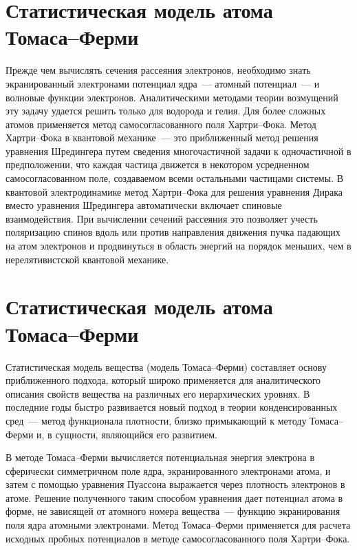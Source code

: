 
  \section{Статистическая модель атома Томаса--Ферми}

  Прежде чем вычислять сечения рассеяния электронов, необходимо знать
  экранированный электронами потенциал ядра~--- атомный потенциал~--- и волновые
  функции электронов. Аналитическими методами теории возмущений эту задачу
  удается решить только для водорода и гелия. Для более сложных атомов
  применяется метод самосогласованного поля Хартри--Фока. Метод Хартри--Фока в
  квантовой механике~--- это приближенный метод решения уравнения Шредингера
  путем сведения многочастичной задачи к одночастичной в предположении, что
  каждая частица движется в некотором усредненном самосогласованном поле,
  создаваемом всеми остальными частицами системы. В квантовой электродинамике
  метод Хартри--Фока для решения уравнения Дирака вместо уравнения Шредингера
  автоматически включает спиновые взаимодействия. При вычислении сечений
  рассеяния это позволяет учесть поляризацию спинов вдоль или против направления
  движения пучка падающих на атом электронов и продвинуться в область энергий на
  порядок меньших, чем в нерелятивистской квантовой механике.
  
  \section{Статистическая модель атома Томаса--Ферми}

  Статистическая модель вещества (модель Томаса--Ферми) составляет основу
  приближенного подхода, который широко применяется для аналитического описания
  свойств вещества на различных его иерархических уровнях. В последние годы
  быстро развивается новый подход в теории конденсированных сред~--- метод
  функционала плотности, близко примыкающий к методу Томаса--Ферми и, в
  сущности, являющийся его развитием.
  
  В методе Томаса--Ферми вычисляется потенциальная энергия электрона в
  сферически симметричном поле ядра, экранированного электронами атома, и затем
  с помощью уравнения Пуассона выражается через плотность электронов в атоме.
  Решение полученного таким способом уравнения дает потенциал атома в форме, не
  зависящей от атомного номера вещества~--- функцию экранирования поля ядра
  атомными электронами. Метод Томаса--Ферми применяется для расчета исходных
  пробных потенциалов в методе самосогласованного поля Хартри--Фока.
  
